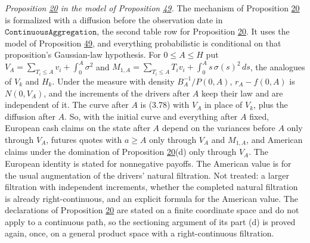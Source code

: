 \documentclass[11pt]{article}
\begin{document}
\emph{Proposition \hyperref[res:Proposition-20]{20} in the model of Proposition \hyperref[res:Proposition-49]{49}.} The mechanism of Proposition \hyperref[res:Proposition-20]{20} is formalized with a diffusion before the observation date in \(\texttt{ContinuousAggregation}\), the second table row for Proposition \hyperref[res:Proposition-20]{20}. It uses the model of Proposition \hyperref[res:Proposition-49]{49}, and everything probabilistic is conditional on that proposition's Gaussian-law hypothesis. For \(0\le A\le H\) put \(V_A=\sum_{T_i\le A}v_i+\int_0^A\sigma^2\) and \(M_{1,A}=\sum_{T_i\le A}T_iv_i+\int_0^As\,\sigma(s)^2\,ds\), the analogues of \(V_k\) and \(H_k\). Under the measure with density \(B_A^{-1}/P(0,A)\), \(r_A-f(0,A)\) is \(N(0,V_A)\), and the increments of the drivers after \(A\) keep their law and are independent of it. The curve after \(A\) is (3.78) with \(V_A\) in place of \(V_k\), plus the diffusion after \(A\). So, with the initial curve and everything after \(A\) fixed, European cash claims on the state after \(A\) depend on the variances before \(A\) only through \(V_A\), futures quotes with \(a\ge A\) only through \(V_A\) and \(M_{1,A}\), and American claims under the domination of Proposition \hyperref[res:Proposition-20]{20}(d) only through \(V_A\). The European identity is stated for nonnegative payoffs. The American value is for the usual augmentation of the drivers' natural filtration. Not treated: a larger filtration with independent increments, whether the completed natural filtration is already right-continuous, and an explicit formula for the American value. The declarations of Proposition \hyperref[res:Proposition-20]{20} are stated on a finite coordinate space and do not apply to a continuous path, so the sectioning argument of its part (d) is proved again, once, on a general product space with a right-continuous filtration.
\end{document}
